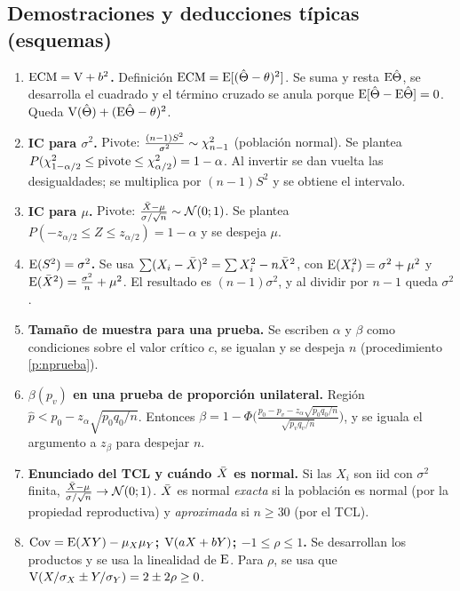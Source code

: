 \subsection{Demostraciones y deducciones típicas (esquemas)}\label{p:demos}
\begin{pasos}
\small
\begin{enumerate}[label=\textbf{(\arabic*)},leftmargin=*,itemsep=4pt]
\item \textbf{$\mathrm{ECM}=\mathrm{V}+b^2$.} Definición $\mathrm{ECM}=\mathrm{E}[(\hat\Theta-\theta)^2]$. Se suma y resta $\mathrm{E}\hat\Theta$, se desarrolla el cuadrado y el término cruzado se anula porque $\mathrm{E}[\hat\Theta-\mathrm{E}\hat\Theta]=0$. Queda $\mathrm{V}(\hat\Theta)+(\mathrm{E}\hat\Theta-\theta)^2$.
\item \textbf{IC para $\sigma^2$.} Pivote: $\frac{(n-1)S^2}{\sigma^2}\sim\chi^2_{n-1}$ (población normal). Se plantea $P(\chi^2_{1-\alpha/2}\le\text{pivote}\le\chi^2_{\alpha/2})=1-\alpha$. Al invertir se dan vuelta las desigualdades; se multiplica por $(n-1)S^2$ y se obtiene el intervalo.
\item \textbf{IC para $\mu$.} Pivote: $\frac{\bar{X}-\mu}{\sigma/\sqrt n}\sim\mathcal{N}(0;1)$. Se plantea $P(-z_{\alpha/2}\le Z\le z_{\alpha/2})=1-\alpha$ y se despeja $\mu$.
\item \textbf{$\mathrm{E}(S^2)=\sigma^2$.} Se usa $\sum(X_i-\bar{X})^2=\sum X_i^2-n\bar{X}^2$, con $\mathrm{E}(X_i^2)=\sigma^2+\mu^2$ y $\mathrm{E}(\bar{X}^2)=\frac{\sigma^2}n+\mu^2$. El resultado es $(n-1)\sigma^2$, y al dividir por $n-1$ queda $\sigma^2$.
\item \textbf{Tamaño de muestra para una prueba.} Se escriben $\alpha$ y $\beta$ como condiciones sobre el valor crítico $c$, se igualan y se despeja $n$ (procedimiento \ref{p:nprueba}).
\item \textbf{$\beta(p_v)$ en una prueba de proporción unilateral.} Región $\hat p<p_0-z_\alpha\sqrt{p_0q_0/n}$. Entonces $\beta=1-\Phi\Big(\frac{p_0-p_v-z_\alpha\sqrt{p_0q_0/n}}{\sqrt{p_vq_v/n}}\Big)$, y se iguala el argumento a $z_\beta$ para despejar $n$.
\item \textbf{Enunciado del TCL y cuándo $\bar{X}$ es normal.} Si las $X_i$ son iid con $\sigma^2$ finita, $\frac{\bar{X}-\mu}{\sigma/\sqrt n}\to\mathcal{N}(0;1)$. $\bar{X}$ es normal \emph{exacta} si la población es normal (por la propiedad reproductiva) y \emph{aproximada} si $n\ge30$ (por el TCL).
\item \textbf{$\mathrm{Cov}=\mathrm{E}(XY)-\mu_X\mu_Y$; $\mathrm{V}(aX+bY)$; $-1\le\rho\le1$.} Se desarrollan los productos y se usa la linealidad de $\mathrm{E}$. Para $\rho$, se usa que $\mathrm{V}(X/\sigma_X\pm Y/\sigma_Y)=2\pm2\rho\ge0$.
\end{enumerate}
\end{pasos}

